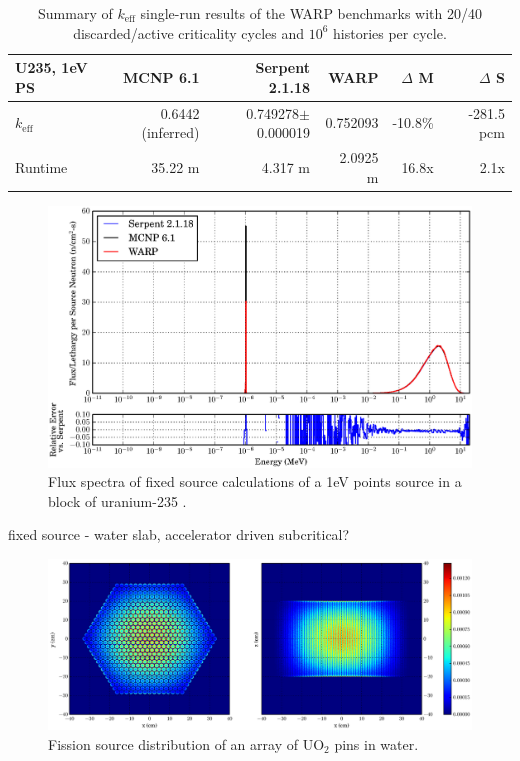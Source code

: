 \begin{table}[h]
\centering
\caption{Summary of $k_\mathrm{eff}$ single-run results of the WARP benchmarks with 20/40 discarded/active criticality cycles and $10^6$ histories per cycle.}
\label{fixed_summary}
\begin{tabular}{| l | r | r | r | r | r |}
 \hline
  U235, 1eV PS & MCNP 6.1 & Serpent 2.1.18 & WARP & $\Delta$ M & $\Delta$ S  \\
\hline
\hline
 $k_\mathrm{eff}$ & 0.6442 (inferred) & 0.749278$\pm$0.000019 & 0.752093 & -10.8\%  & -281.5 pcm   \\
 \hline
 Runtime               & 35.22 m & 4.317 m &  2.0925 m & 16.8x  & 2.1x  \\
 \hline
\end{tabular}
\end{table}

\begin{figure}[h!]
\centering
\includegraphics[width=\textwidth]{graphics/finalresults/fixed_spec.eps}
\caption{Flux spectra of fixed source calculations of a 1eV points source in a block of uranium-235 . \label{fixed_spec} }
\end{figure}

fixed source - water slab, accelerator driven subcritical?

\begin{figure}[h!]
\centering
\includegraphics[width=\textwidth,trim= 2cm 0cm 2cm 0cm]{graphics/finalresults/assembly_fiss-6.eps}
\caption{Fission source distribution of an array of UO$_2$ pins in water. \label{assembly_fiss} }
\end{figure}

